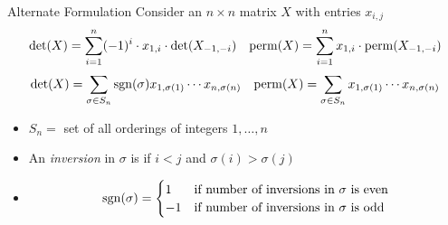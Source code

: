 \documentclass[aspectratio=169]{beamer}
\begin{document}
\begin{frame}{Alternate Formulation}
    Consider an $n \times n$ matrix $X$ with entries $x_{i, j}$
    \begin{align*}
        \det(X) = \sum_{i = 1}^n (-1)^i \cdot x_{1, i} \cdot \det(X_{-1, -i}) && \operatorname{perm}(X) = \sum_{i = 1}^n x_{1, i} \cdot \operatorname{perm}(X_{-1, -i}) 
    \end{align*} \pause
    \vspace{-10pt}
    \begin{align*}
        \det(X) = \sum_{\sigma \in S_n} \operatorname{sgn}(\sigma) x_{1, \sigma(1)} \cdots x_{n, \sigma(n)} && \operatorname{perm}(X) = \sum_{\sigma \in S_n} x_{1, \sigma(1)} \cdots x_{n, \sigma(n)}
    \end{align*}
    \vspace{-10pt}
    \begin{itemize}
        \item $S_n = $ set of all orderings of integers $1, \ldots, n$ \pause
        \item An \emph{inversion} in $\sigma$ is if $i < j$ and $\sigma(i) > \sigma(j)$ 
        \item
        \[
            \operatorname{sgn}(\sigma) = \begin{cases}
                                1 & \text{if number of inversions in } \sigma \text{ is even} \\
                                -1 & \text{if number of inversions in } \sigma \text{ is odd}
                            \end{cases}
        \]
    \end{itemize}
\end{frame}
\end{document}
